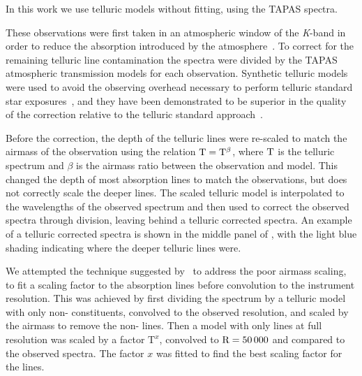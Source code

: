 In this work we use telluric models without fitting, using the {TAPAS} spectra.

These observations were first taken in an atmospheric window of the \emph{K}-band in order to reduce the absorption introduced by the atmosphere~\citep{barnes_hd_2008}.
 To correct for the remaining telluric line contamination the spectra were divided by the {TAPAS}\citep{bertaux_tapas_2014} atmospheric transmission models for each observation.
Synthetic telluric models were used to avoid the observing overhead necessary to perform telluric standard star exposures~\citep{vacca_method_2003}, and they have been demonstrated to be superior in the quality of the correction relative to the telluric standard approach~\citep[e.g.][]{cotton_atmospheric_2014}.

Before the correction, the depth of the telluric lines were re-scaled to match the airmass of the observation using the relation \(\rm T = T^{\beta}\), where \(\rm T\) is the telluric spectrum and \(\beta\) is the airmass ratio between the observation and model.
This changed the depth of most absorption lines to match the observations, but does not correctly scale the deeper  lines.
The scaled telluric model is interpolated to the wavelengths of the observed spectrum and then used to correct the observed spectra through division, leaving behind a telluric corrected spectra.
An example of a telluric corrected spectra is shown in the middle panel of , with the light blue shading indicating where the deeper telluric lines were.

We attempted the technique suggested by~\citet{bertaux_tapas_2014} to address the poor  airmass scaling, to fit a scaling factor to the   absorption lines before convolution to the instrument resolution.
This was achieved by first dividing the spectrum by a telluric model with only non- constituents, convolved to the observed resolution, and scaled by the airmass to remove the non- lines.
Then a model with only  lines at full resolution was scaled by a factor \(\textrm{T}^{x}\), convolved to \(\rm R=50\,000\) and compared to the observed spectra.
The factor \(x\) was fitted to find the best scaling factor for the  lines.

